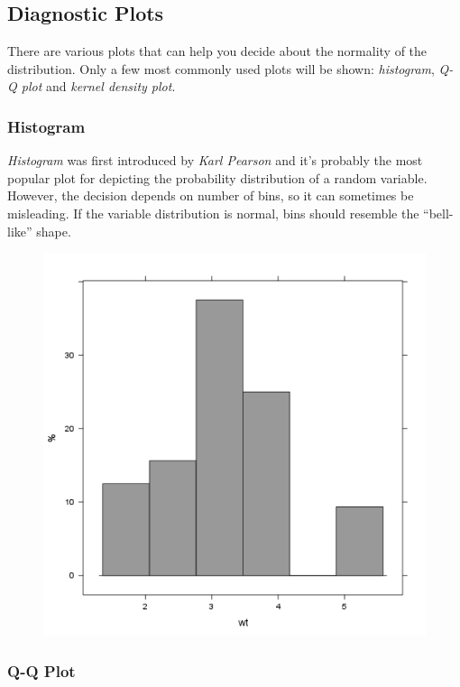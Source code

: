 \documentclass{article}
\makeatletter
\def\maxwidth{\ifdim\Gin@nat@width>\linewidth\linewidth
\else\Gin@nat@width\fi}
\let\Oldincludegraphics\includegraphics
\renewcommand{\includegraphics}[1]{\Oldincludegraphics[width=\maxwidth]{#1}}
\makeatother
\begin{document}
\subsection{Diagnostic Plots}

There are various plots that can help you decide about the normality of
the distribution. Only a few most commonly used plots will be shown:
\emph{histogram}, \emph{Q-Q plot} and \emph{kernel density plot}.

\subsubsection{Histogram}

\emph{Histogram} was first introduced by \emph{Karl Pearson} and it's
probably the most popular plot for depicting the probability
distribution of a random variable. However, the decision depends on
number of bins, so it can sometimes be misleading. If the variable
distribution is normal, bins should resemble the ``bell-like'' shape.

\begin{figure}[htbp]
\centering
\includegraphics{10caa8222b28328a6d8fd28917cbfb45.png}
\caption{}
\end{figure}

\subsubsection{Q-Q Plot}
\end{document}

